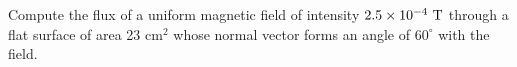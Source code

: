 Compute the flux of a uniform magnetic field of intensity  
$2.5 \times 10^{-4} \ \text T$ through a
flat surface of area 23 cm$^2$ whose normal vector forms an angle of 
$60^\circ$ with the field.